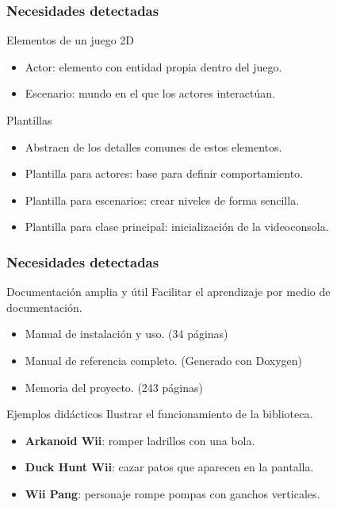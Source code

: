 \begin{frame}	
\frametitle{Necesidades detectadas}
	\begin{block}{Elementos de un juego 2D}
		\begin{itemize}
			\item Actor: elemento con entidad propia dentro del juego.
			\item Escenario: mundo en el que los actores interactúan.
		\end{itemize}
	\end{block}
	\begin{block}{Plantillas}
		\begin{itemize}
			\item Abstraen de los detalles comunes de estos elementos.
			\item Plantilla para actores: base para definir comportamiento.
			\item Plantilla para escenarios: crear niveles de forma sencilla.
			\item Plantilla para clase principal: inicialización de la videoconsola.
		\end{itemize}
	\end{block}
\end{frame}

\begin{frame}	
\frametitle{Necesidades detectadas}
	\begin{block}{Documentación amplia y útil}
		\noindent Facilitar el aprendizaje por medio de documentación.
		\begin{itemize}
			\item Manual de instalación y uso. (34 páginas)
			\item Manual de referencia completo. (Generado con Doxygen)
			\item Memoria del proyecto. (243 páginas)
		\end{itemize}
	\end{block}
	\pause
	\begin{block}{Ejemplos didácticos}
		\noindent Ilustrar el funcionamiento de la biblioteca.
		\begin{itemize}
			\item \textbf{Arkanoid Wii}: romper ladrillos con una bola.
			\item \textbf{Duck Hunt Wii}: cazar patos que aparecen en la pantalla.
			\item \textbf{Wii Pang}: personaje rompe pompas con ganchos verticales.
		\end{itemize}
	\end{block}
\end{frame}

